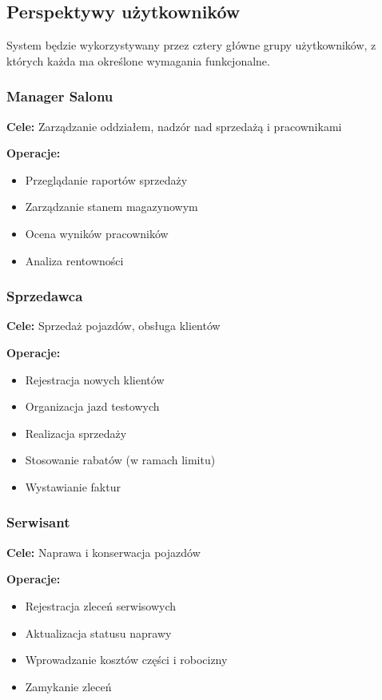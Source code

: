 \documentclass[a4paper,titleauthor]{mwart}
\begin{document}
	\subsection{Perspektywy użytkowników}
	
	System będzie wykorzystywany przez cztery główne grupy użytkowników, z których każda ma określone wymagania funkcjonalne.
	
	\subsubsection{Manager Salonu}
	
	\textbf{Cele:} Zarządzanie oddziałem, nadzór nad sprzedażą i pracownikami
	
	\textbf{Operacje:}
	\begin{itemize}
		\item Przeglądanie raportów sprzedaży
		\item Zarządzanie stanem magazynowym
		\item Ocena wyników pracowników
		\item Analiza rentowności
	\end{itemize}
	
	\subsubsection{Sprzedawca}
	
	\textbf{Cele:} Sprzedaż pojazdów, obsługa klientów
	
	\textbf{Operacje:}
	\begin{itemize}
		\item Rejestracja nowych klientów
		\item Organizacja jazd testowych
		\item Realizacja sprzedaży
		\item Stosowanie rabatów (w ramach limitu)
		\item Wystawianie faktur
	\end{itemize}
	
	\subsubsection{Serwisant}
	
	\textbf{Cele:} Naprawa i konserwacja pojazdów
	
	\textbf{Operacje:}
	\begin{itemize}
		\item Rejestracja zleceń serwisowych
		\item Aktualizacja statusu naprawy
		\item Wprowadzanie kosztów części i robocizny
		\item Zamykanie zleceń
	\end{itemize}
	
\end{document}

